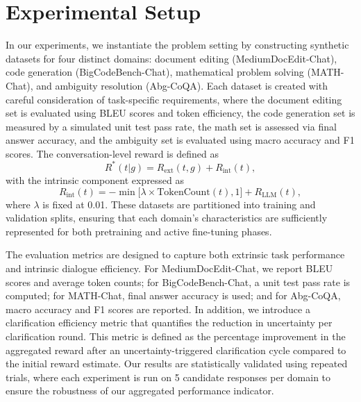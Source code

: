 \documentclass{article}
\begin{document}
\section{Experimental Setup}
In our experiments, we instantiate the problem setting by constructing synthetic datasets for four distinct domains: document editing (MediumDocEdit-Chat), code generation (BigCodeBench-Chat), mathematical problem solving (MATH-Chat), and ambiguity resolution (Abg-CoQA). Each dataset is created with careful consideration of task-specific requirements, where the document editing set is evaluated using BLEU scores and token efficiency, the code generation set is measured by a simulated unit test pass rate, the math set is assessed via final answer accuracy, and the ambiguity set is evaluated using macro accuracy and F1 scores. The conversation-level reward is defined as 
\[
R^*(t|g) = R_{\text{ext}}(t,g) + R_{\text{int}}(t),
\]
with the intrinsic component expressed as 
\[
R_{\text{int}}(t) = -\min\bigl[\lambda \times \text{TokenCount}(t), 1\bigr] + R_{\text{LLM}}(t),
\]
where \(\lambda\) is fixed at 0.01. These datasets are partitioned into training and validation splits, ensuring that each domain's characteristics are sufficiently represented for both pretraining and active fine-tuning phases.

The evaluation metrics are designed to capture both extrinsic task performance and intrinsic dialogue efficiency. For MediumDocEdit-Chat, we report BLEU scores and average token counts; for BigCodeBench-Chat, a unit test pass rate is computed; for MATH-Chat, final answer accuracy is used; and for Abg-CoQA, macro accuracy and F1 scores are reported. In addition, we introduce a clarification efficiency metric that quantifies the reduction in uncertainty per clarification round. This metric is defined as the percentage improvement in the aggregated reward after an uncertainty-triggered clarification cycle compared to the initial reward estimate. Our results are statistically validated using repeated trials, where each experiment is run on 5 candidate responses per domain to ensure the robustness of our aggregated performance indicator.
\end{document}
